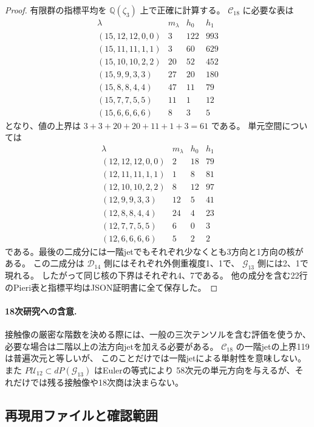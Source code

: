 \documentclass[a4paper,11pt]{ltjsarticle}
\theoremstyle{definition}
\begin{document}
\begin{proof}
有限群の指標平均を $\mathbb Q(\zeta_3)$ 上で正確に計算する。
$\mathcal C_{18}$ に必要な表は
\[
\begin{array}{c|r|r|r}
\lambda&m_\lambda&h_0&h_1\\\hline
(15,12,12,0,0)&3&122&993\\
(15,11,11,1,1)&3&60&629\\
(15,10,10,2,2)&20&52&452\\
(15,9,9,3,3)&27&20&180\\
(15,8,8,4,4)&47&11&79\\
(15,7,7,5,5)&11&1&12\\
(15,6,6,6,6)&8&3&5
\end{array}
\]
となり、値の上界は $3+3+20+20+11+1+3=61$ である。
単元空間については
\[
\begin{array}{c|r|r|r}
\lambda&m_\lambda&h_0&h_1\\\hline
(12,12,12,0,0)&2&18&79\\
(12,11,11,1,1)&1&8&81\\
(12,10,10,2,2)&8&12&97\\
(12,9,9,3,3)&12&5&41\\
(12,8,8,4,4)&24&4&23\\
(12,7,7,5,5)&6&0&3\\
(12,6,6,6,6)&5&2&2
\end{array}
\]
である。最後の二成分には一階jetでもそれぞれ少なくとも3方向と1方向の核がある。
この二成分は $\mathcal D_{14}$ 側にはそれぞれ外側重複度1、1で、
$\mathcal G_{13}$ 側には2、1で現れる。
したがって同じ核の下界はそれぞれ4、7である。
他の成分を含む22行のPieri表と指標平均はJSON証明書に全て保存した。
\end{proof}

\paragraph{18次研究への含意.}
接触像の厳密な階数を決める際には、一般の三次テンソルを含む評価を使うか、
必要な場合は二階以上の法方向jetを加える必要がある。
$\mathcal C_{18}$ の一階jetの上界119は普遍次元と等しいが、
このことだけでは一階jetによる単射性を意味しない。
また $P\mathcal U_{12}\subset dP(\mathcal G_{13})$ はEulerの等式により
58次元の単元方向を与えるが、それだけでは残る接触像や18次商は決まらない。

\subsection{再現用ファイルと確認範囲}
\end{document}
